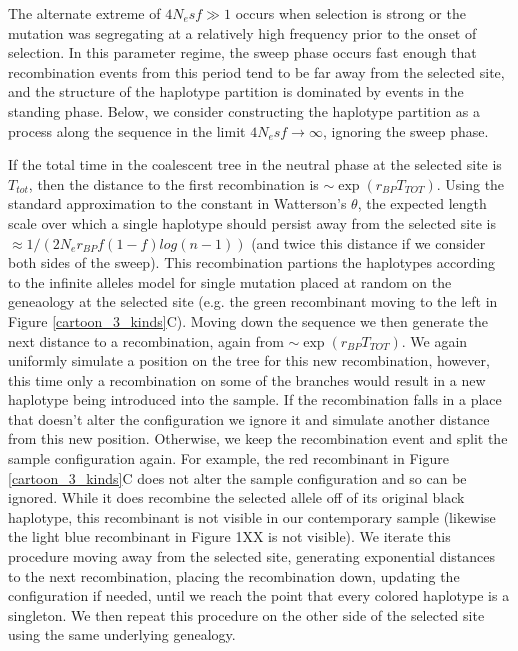 \documentclass[a4paper,10pt]{article}
\begin{document}
The alternate extreme of $4N_e s f \gg 1$ occurs when selection is strong or the mutation was segregating at a relatively high frequency prior to the onset of selection. In this parameter regime, the sweep phase occurs fast enough that recombination events from this period tend to be far away from the selected site, and the structure of the haplotype partition is dominated by events in the standing phase. Below, we consider constructing the haplotype partition as a process along the sequence in the limit $4N_e s f \rightarrow \infty$, ignoring the sweep phase. 

If the total time in the coalescent tree in the neutral phase at the selected site is $T_{tot}$, then the distance to the first recombination is $\sim \exp \left( r_{BP} T_{TOT} \right)$. Using the standard approximation to the constant in Watterson's $\theta$, the expected length scale over which a single haplotype should persist away from the selected site is $\approx 1/( 2 N_e r_{BP}f\left(1-f\right) log(n-1))$ (and twice this distance if we consider both sides of the sweep). This recombination partions the haplotypes according to the infinite alleles model for single mutation placed at random on the geneaology at the selected site (e.g. the green recombinant moving to the left in Figure \ref{cartoon_3_kinds}C). Moving down the sequence we then generate the next distance to a recombination, again from $\sim \exp \left( r_{BP} T_{TOT} \right)$. We again uniformly simulate a position on the tree for this new recombination, however, this time only a recombination on some of the branches would result in a new haplotype being introduced into the sample. If the recombination falls in a place that doesn't alter the configuration we ignore it and simulate another distance from this new position. Otherwise, we keep the recombination event and split the sample configuration again. For example, the red recombinant in Figure \ref{cartoon_3_kinds}C does not alter the sample configuration and so can be ignored. While it does recombine the selected allele off of its original black haplotype, this recombinant is not visible in our contemporary sample (likewise the light blue recombinant in Figure 1XX is not visible). We iterate this procedure moving away from the selected site, generating exponential distances to the next recombination, placing the recombination down, updating the configuration if needed, until we reach the point that every colored haplotype is a singleton. We then repeat this procedure on the other side of the selected site using the same underlying genealogy.
\end{document}
